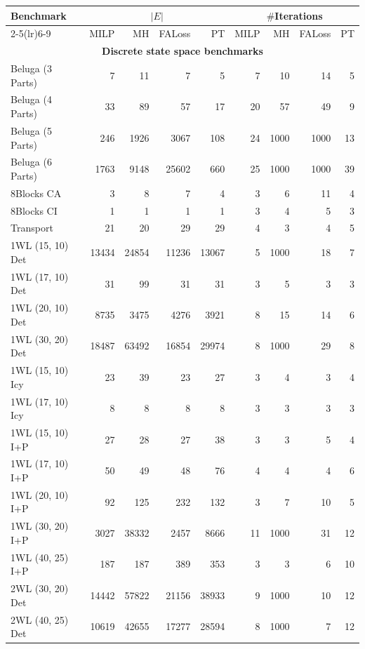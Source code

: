 \noindent%
\scriptsize
{
\begin{tabular}{|l|rrrr|rrrr|}
\toprule
Benchmark & \multicolumn{4}{|c|}{$|E|$} & \multicolumn{4}{|c|}{$\#$Iterations} \\
\cmidrule(lr){2-5}\cmidrule(lr){6-9}
 & MILP & MH & FALoss & PT & MILP & MH & FALoss & PT \\
\midrule
\multicolumn{9}{|c|}{\textbf{Discrete state space benchmarks}}\\\hline
Beluga (3 Parts) & 7 & 11 & 7 & 5 & 7 & 10 & 14 & 5 \\
Beluga (4 Parts) & 33 & 89 & 57 & 17 & 20 & 57 & 49 & 9 \\
Beluga (5 Parts) & 246 & 1926 & 3067 & 108 & 24 & 1000 & 1000 & 13 \\
Beluga (6 Parts) & 1763 & 9148 & 25602 & 660 & 25 & 1000 & 1000 & 39 \\
\hline
8Blocks CA & 3 & 8 & 7 & 4 & 3 & 6 & 11 & 4 \\
8Blocks CI & 1 & 1 & 1 & 1 & 3 & 4 & 5 & 3 \\
\hline
Transport & 21 & 20 & 29 & 29 & 4 & 3 & 4 & 5 \\
\hline
1WL (15, 10) Det & 13434 & 24854 & 11236 & 13067 & 5 & 1000 & 18 & 7 \\
1WL (17, 10) Det & 31 & 99 & 31 & 31 & 3 & 5 & 3 & 3 \\
1WL (20, 10) Det & 8735 & 3475 & 4276 & 3921 & 8 & 15 & 14 & 6 \\
1WL (30, 20) Det & 18487 & 63492 & 16854 & 29974 & 8 & 1000 & 29 & 8 \\
\hline
1WL (15, 10) Icy & 23 & 39 & 23 & 27 & 3 & 4 & 3 & 4 \\
1WL (17, 10) Icy & 8 & 8 & 8 & 8 & 3 & 3 & 3 & 3 \\
\hline
1WL (15, 10) I+P & 27 & 28 & 27 & 38 & 3 & 3 & 5 & 4 \\
1WL (17, 10) I+P & 50 & 49 & 48 & 76 & 4 & 4 & 4 & 6 \\
1WL (20, 10) I+P & 92 & 125 & 232 & 132 & 3 & 7 & 10 & 5 \\
1WL (30, 20) I+P & 3027 & 38332 & 2457 & 8666 & 11 & 1000 & 31 & 12 \\
1WL (40, 25) I+P & 187 & 187 & 389 & 353 & 3 & 3 & 6 & 10 \\
\hline
2WL (30, 20) Det & 14442 & 57822 & 21156 & 38933 & 9 & 1000 & 10 & 12 \\
2WL (40, 25) Det & 10619 & 42655 & 17277 & 28594 & 8 & 1000 & 7 & 12 \\

\end{tabular}}
